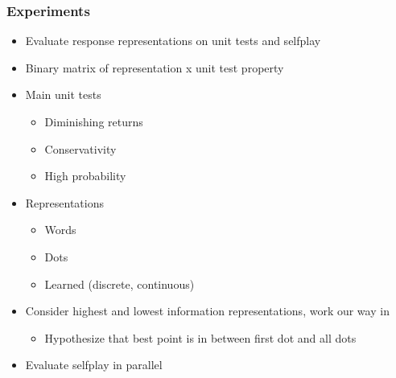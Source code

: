 \documentclass{beamer}
\begin{document}
\begin{frame}
\frametitle{Experiments}
\begin{itemize}
\item Evaluate response representations on unit tests and selfplay
\item Binary matrix of representation x unit test property
\item Main unit tests
    \begin{itemize}
    \item Diminishing returns
    \item Conservativity
    \item High probability
    \end{itemize}
\item Representations
    \begin{itemize}
    \item Words
    \item Dots
    \item Learned (discrete, continuous)
    \end{itemize}
\item Consider highest and lowest information representations,
    work our way in
    \begin{itemize}
    \item Hypothesize that best point is in between first dot and all dots
    \end{itemize}
\item Evaluate selfplay in parallel
\end{itemize}
\end{frame}
\end{document}
